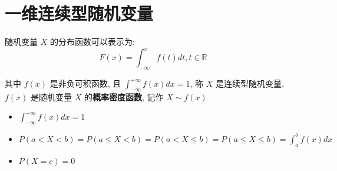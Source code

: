 \section{一维连续型随机变量}

\begin{definition}[连续型随机变量分布函数和密度函数]
	随机变量 $X$ 的分布函数可以表示为: 
	$$F(x) = \int_{-\infty}^{x}f(t)dt, t\in\mathbb{R}$$
	
	其中 $f(x)$ 是非负可积函数, 且 $\int_{-\infty}^{+\infty}f(x)dx = 1$, 称 $X$ 是连续型随机变量, 
	$f(x)$ 是随机变量 $X$ 的\textbf{概率密度函数}, 记作 $X\sim f(x)$
	
\end{definition}
\begin{corollary}[连续型随机变量分布函数性质]
	\begin{itemize}
		\item $\int_{-\infty}^{+\infty}f(x)dx = 1$
		\item $P(a<X<b) = P(a\leq X < b)= P(a < X \leq b) = P(a\leq X\leq b) = \int_{a}^{b}f(x)dx$
		\item $P(X = c) = 0$
	\end{itemize}
\end{corollary}

